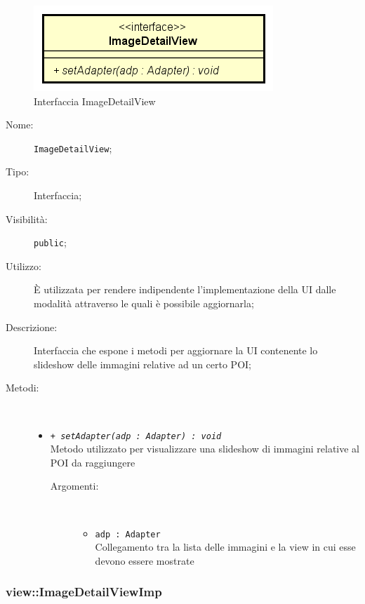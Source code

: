 \documentclass[../DefinizioneDiProdotto.tex]{subfiles}
\begin{document}
    \begin{figure}[H]
        \centering
        \includegraphics{img/ImageDetailView.png}
        \caption{Interfaccia ImageDetailView}\label{fig:view::ImageDetailView} 
    \end{figure}
    \begin{description}
\item[Nome:] \texttt{ImageDetailView};
\item[Tipo:] Interfaccia;
\item[Visibilità:] \texttt{public};
\item[Utilizzo:] È utilizzata per rendere indipendente l'implementazione della UI dalle modalità attraverso le quali è possibile aggiornarla;
\item[Descrizione:] Interfaccia che espone i metodi per aggiornare la UI contenente lo slideshow delle immagini relative ad un certo POI;
\item[Metodi:] \
\begin{itemize}
\item \texttt{+ \textit{setAdapter(adp : Adapter) : void}}\\
Metodo utilizzato per visualizzare una slideshow di immagini relative al POI da raggiungere
 \begin{description}
\item[Argomenti:] \
\begin{itemize}
\item \texttt{adp : Adapter}\\
Collegamento tra la lista delle immagini e la view in cui esse devono essere mostrate\end{itemize}
\end{description}
\end{itemize}
\end{description}

\subsubsection{view::ImageDetailViewImp}
\end{document}
